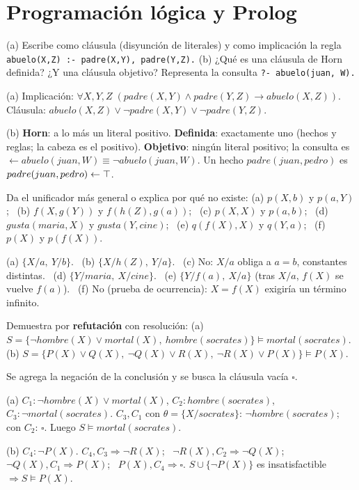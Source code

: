 \section{Programación lógica y Prolog}

\begin{prob}
(a) Escribe como cláusula (disyunción de literales) y como implicación la regla \texttt{abuelo(X,Z) :- padre(X,Y), padre(Y,Z).} (b) ¿Qué es una cláusula de Horn definida? ¿Y una cláusula objetivo? Representa la consulta \texttt{?- abuelo(juan, W).}
\end{prob}
\begin{sol}
(a) Implicación: $\forall X,Y,Z\;(padre(X,Y)\land padre(Y,Z)\to abuelo(X,Z))$. Cláusula: $abuelo(X,Z)\lor\neg padre(X,Y)\lor\neg padre(Y,Z)$.

(b) \textbf{Horn}: a lo más un literal positivo. \textbf{Definida}: exactamente uno (hechos y reglas; la cabeza es el positivo). \textbf{Objetivo}: ningún literal positivo; la consulta es $\leftarrow abuelo(juan,W)\equiv\neg abuelo(juan,W)$. Un hecho $padre(juan,pedro)$ es $padre(juan,pedro)\leftarrow\top$.
\end{sol}

\begin{prob}
Da el unificador más general o explica por qué no existe:
(a) $p(X,b)$ y $p(a,Y)$; \ (b) $f(X,g(Y))$ y $f(h(Z),g(a))$; \ (c) $p(X,X)$ y $p(a,b)$; \ (d) $gusta(maria,X)$ y $gusta(Y,cine)$; \ (e) $q(f(X),X)$ y $q(Y,a)$; \ (f) $p(X)$ y $p(f(X))$.
\end{prob}
\begin{sol}
(a) $\{X/a,\ Y/b\}$. \ (b) $\{X/h(Z),\ Y/a\}$. \ (c) No: $X/a$ obliga a $a=b$, constantes distintas. \ (d) $\{Y/maria,\ X/cine\}$. \ (e) $\{Y/f(a),\ X/a\}$ (tras $X/a$, $f(X)$ se vuelve $f(a)$). \ (f) No (prueba de ocurrencia): $X=f(X)$ exigiría un término infinito.
\end{sol}

\begin{prob}
Demuestra por \textbf{refutación} con resolución:
(a) $S=\{\neg hombre(X)\lor mortal(X),\ hombre(socrates)\}\models mortal(socrates)$.
(b) $S=\{P(X)\lor Q(X),\ \neg Q(X)\lor R(X),\ \neg R(X)\lor P(X)\}\models P(X)$.
\end{prob}
\begin{sol}
Se agrega la negación de la conclusión y se busca la cláusula vacía $\square$.

(a) $C_1:\neg hombre(X)\lor mortal(X)$, $C_2: hombre(socrates)$, $C_3:\neg mortal(socrates)$.
$C_3,C_1$ con $\theta=\{X/socrates\}$: $\neg hombre(socrates)$; con $C_2$: $\square$. Luego $S\models mortal(socrates)$.

(b) $C_4:\neg P(X)$.
$C_4,C_3\Rightarrow\neg R(X)$; \ $\neg R(X),C_2\Rightarrow\neg Q(X)$; \ $\neg Q(X),C_1\Rightarrow P(X)$; \ $P(X),C_4\Rightarrow\square$.
$S\cup\{\neg P(X)\}$ es insatisfactible $\Rightarrow S\models P(X)$.
\end{sol}

